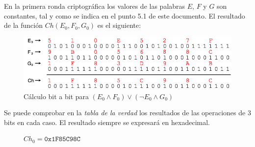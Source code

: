 \documentclass{article}
\begin{document}
        \vspace{3mm}
        En la primera ronda criptográfica los valores de las palabras $E$, $F$ y $G$ son constantes, tal y como se indica en el punto 5.1 de este documento. El resultado de la función $Ch(E_{0}, F_{0}, G_{0})$ es el siguiente:
            \begin{figure}[H]
            \centering
                \includegraphics[scale=0.41]{img/SHA-256-function_Ch.png}
                \caption{Cálculo bit a bit para $(E_{0} \land F_{0}) \lor (\lnot E_{0} \land G_{0})$}
            \end{figure}
        Se puede comprobar en la \textit{tabla de la verdad} los resultados de las operaciones de 3 bits en cada caso. El resultado siempre se expresará en hexadecimal.
            \begin{figure}[H]
            \centering
                $Ch_{0} = \texttt{0x1F85C98C}$
            \end{figure}
        
\end{document}

